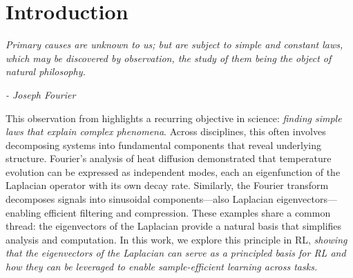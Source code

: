 \documentclass{article}
\theoremstyle{plain}
\theoremstyle{definition}
\theoremstyle{remark}
\begin{document}
\begin{abstract}

Across scientific disciplines, Laplacian eigenvectors serve as a fundamental basis for simplifying complex systems, from signal processing to quantum mechanics. In reinforcement learning (RL), these eigenvectors provide a natural basis for approximating reward functions; however, their use is typically limited to their linear span, which restricts expressivity in complex environments. We introduce the Laplacian Keyboard (LK), a hierarchical framework that goes beyond the linear span. LK constructs a task-agnostic library of options from these eigenvectors, forming a behavior basis guaranteed to contain the optimal policy for any reward within the linear span. A meta-policy learns to stitch these options dynamically, enabling efficient learning of policies outside the original linear constraints. We establish theoretical bounds on zero-shot approximation error and demonstrate empirically that LK surpasses zero-shot solutions while achieving improved sample efficiency compared to standard RL methods. 

 
\end{abstract}

\section{Introduction}

\textit{Primary causes are unknown to us; but are subject to simple and constant laws, which may be discovered by observation, the study of them being the object of natural philosophy.}

\hspace*{\fill} \textit{- Joseph Fourier}

This observation from \citet{fourier1878analytical} highlights a recurring objective in science: \textit{finding simple laws that explain complex phenomena}. Across disciplines, this often involves decomposing systems into fundamental components that reveal underlying structure. Fourier's analysis of heat diffusion demonstrated that temperature evolution can be expressed as independent modes, each an eigenfunction of the Laplacian operator with its own decay rate. Similarly, the Fourier transform decomposes signals into sinusoidal components---also Laplacian eigenvectors---enabling efficient filtering and compression. These examples share a common thread: the eigenvectors of the Laplacian provide a natural basis that simplifies analysis and computation. In this work, we explore this principle in RL, \textit{showing that the eigenvectors of the Laplacian can serve as a principled basis for RL and how they can be leveraged to enable sample-efficient learning across tasks.}
\end{document}

